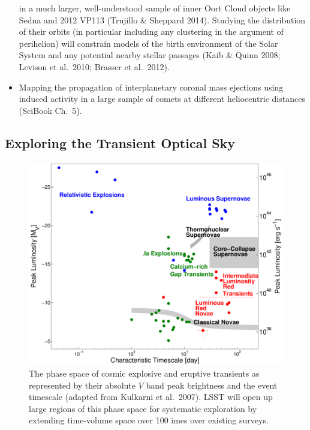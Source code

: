 \documentclass{emulateapj}
\begin{document}
\begin{itemize}
in a much larger, well-understood sample of inner Oort Cloud objects like Sedna and 2012 VP113
 (Trujillo \& Sheppard 2014).  Studying the distribution of their orbits (in particular including any 
clustering in the argument of perihelion) will constrain models of the birth environment of the 
Solar System and any potential nearby stellar passages (Kaib \& Quinn 2008; Levison et al.~2010;
Brasser et al.~2012). 
\item Mapping the propagation of interplanetary coronal mass ejections using induced 
 activity in a large sample of comets at different heliocentric distances
(SciBook Ch.~5).
\end{itemize}



\subsection{ Exploring the Transient Optical Sky }


\begin{figure}
\hskip -0.1in
\vskip -0.1in
\includegraphics[width=1.0\hsize,clip]{taumv.pdf}
\caption{The phase space of cosmic explosive and eruptive transients as
represented by their absolute $V$ band peak brightness and the 
event timescale (adapted from Kulkarni et al.~2007). LSST will open up large 
regions of this phase space for systematic exploration by extending
time-volume space over 100 imes over existing surveys.} 
\label{Fig:shri}
\end{figure}
\end{document}
